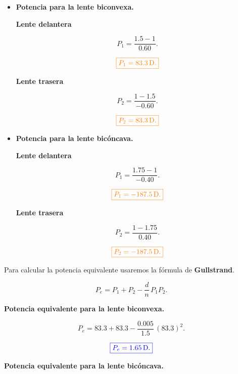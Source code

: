 \documentclass[a4paper,12pt]{article} %
\begin{document}
\begin{itemize}
	\item \textbf{Potencia para la lente biconvexa.}
	
	\textbf{Lente delantera}
	
	\[P_1 = \frac{1.5-1}{0.60}. \]

	\[\textcolor{orange}{\boxed{P_1 = 83.3 \, \mathrm{D}.}}\]

	\vspace{\baselineskip}

	\textbf{Lente trasera}

	\[P_2 = \frac{1-1.5}{-0.60}. \]

	\[\textcolor{orange}{\boxed{P_2 = 83.3 \, \mathrm{D}.}}\]

	\item \textbf{Potencia para la lente bicóncava.}
	
	\textbf{Lente delantera}
	
	\[P_1 = \frac{1.75-1}{-0.40}. \]

	\[\textcolor{orange}{\boxed{P_1 = -187.5 \, \mathrm{D}.}}\]

	\vspace{\baselineskip}

	\textbf{Lente trasera}

	\[P_2 = \frac{1-1.75}{0.40}. \]

	\[\textcolor{orange}{\boxed{P_2 = -187.5 \, \mathrm{D}.}}\]

\end{itemize}

\begin{justify}
	Para calcular la potencia equivalente usaremos la fórmula de \textbf{Gullstrand}.
\end{justify}

\[P_e = P_1 + P_2 - \frac{d}{n} \, P_1 P_2.\]

\vspace{\baselineskip}

\begin{justify}
	\textbf{Potencia equivalente para la lente biconvexa.}
\end{justify}

\[P_e = 83.3 + 83.3 - \frac{0.005}{1.5} \, \left(83.3\right)^2.\]

\[\textcolor{blue}{\boxed{P_e = 1.65 \, \mathrm{D}.}}\]

\vspace{\baselineskip}

\begin{justify}
	\textbf{Potencia equivalente para la lente bicóncava.}
\end{justify}
\end{document}
